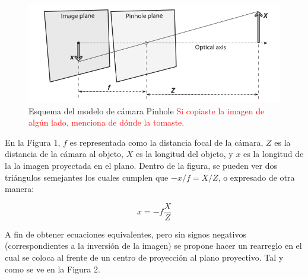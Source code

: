 \documentclass{book}
\begin{document}
\begin{figure}
	\centering		
	\includegraphics[scale=0.5]{pinhole.png}
	\caption{Esquema del modelo de cámara Pinhole \textcolor{red}{Si copiaste la imagen de algún lado, menciona de dónde la tomaste.}}		
\end{figure}

En la Figura 1, $f$ es representada como la distancia focal de la cámara, $Z$ es la distancia de la cámara al objeto, $X$ es la longitud del objeto, y $x$ es la longitud de la la imagen proyectada en el plano. Dentro de la figura, se pueden ver dos triángulos semejantes los cuales cumplen que $-x/f = X/Z$, o expresado de otra manera:

\[x = -f \frac{X}{Z}\]
	
A fin de obtener ecuaciones equivalentes, pero sin signos negativos (correspondientes a la inversión de la imagen) se propone hacer un rearreglo en el cual se coloca al frente de un centro de proyección al plano proyectivo. Tal y como se ve en la Figura 2.
	
\end{document}
